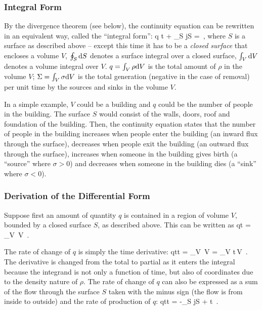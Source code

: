 \subsubsection{Integral Form}
By the divergence theorem (see below), the continuity equation can be rewritten in an equivalent way, called the ``integral form'':
\beq
\xod q t + \oint_{S} j\iprod\dx S = \Sigma\,,
\eeq
where $S$ is a surface as described above -- except this time it has to be a \emph{closed surface} that encloses a volume $V$, $\oint_{S}\text{d} S$ denotes a surface integral over a closed surface, $\int_{V}\text{d} V$ denotes a volume integral over $V$. $q = \int_{V}\rho\text{d} V$ is the total amount of $\rho$ in the volume $V$; $\Sigma = \int_V \sigma\text{d} V$ is the total generation (negative in the case of removal) per unit time by the sources and sinks in the volume $V$.

In a simple example, $V$ could be a building and $q$ could be the number of people in the building. The surface $S$ would consist of the walls, doors, roof and foundation of the building. Then, the continuity equation states that the number of people in the building increases when people enter the building (an inward flux through the surface), decreases when people exit the building (an outward flux through the surface), increases when someone in the building gives birth (a ``source'' where $\sigma > 0$) and decreases when someone in the building dies (a ``sink'' where $\sigma < 0$).

\subsubsection{Derivation of the Differential Form}
Suppose first an amount of quantity $q$ is contained in a region of volume $V$, bounded by a closed surface $S$, as described above. This can be written as
\beq
q\vat t = \int_V \rho{}\,\dx V \,.
\eeq

The rate of change of $q$ is simply the time derivative:
\beq
\xod qt\vat t = \int_V \rho{}\,\dx V = \int_V \xpd\rho t\,\dx V \,.
\eeq
The derivative is changed from the total to partial as it enters the integral because the integrand is not only a function of time, but also of coordinates due to the density nature of $\rho$. The rate of change of $q$ can also be expressed as a sum of the flow through the surface $S$ taken with the minus sign (the flow is from inside to outside) and the rate of production of $q$:
\beq
\xod qt\vat t = -\int_S j\iprod\dx S + \Sigma\vat t \,.
\eeq

